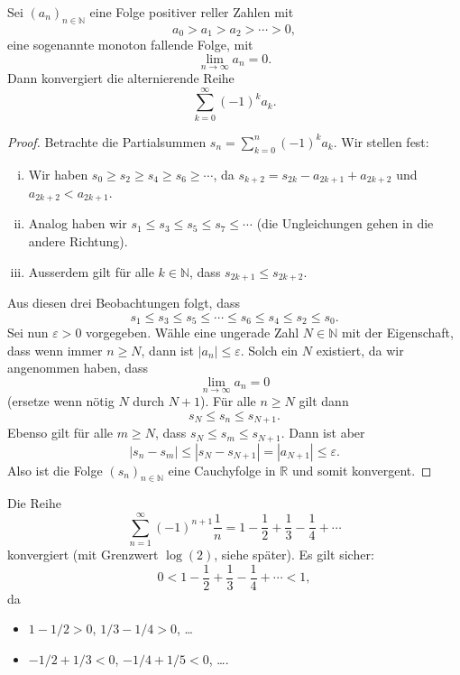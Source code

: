 \documentclass[../main.tex]{subfiles}
\begin{document}
\begin{leibniz}
  Sei ${(a_{n})}_{n \in \mathbb{N}}$ eine Folge
  positiver reller Zahlen mit
  \[
   a_0 > a_1 > a_2 > \cdots > 0,
  \]
  eine sogenannte
  monoton fallende Folge, mit 
  \[
    \lim_{n \to \infty}a_n = 0.
  \]
  Dann konvergiert die alternierende Reihe
  \[
    \sum_{k=0}^{\infty} {(-1)}^k a_k.
  \]
\end{leibniz}

\begin{proof}
  Betrachte die Partialsummen $s_n = \sum_{k=0}^{n} {(-1)}^k a_k$.
  Wir stellen fest:
  \begin{enumerate}[(i)]
    \item Wir haben $s_0 \geq s_2 \geq s_4 \geq s_6 \geq \cdots$,
      da $s_{k+2} = s_{2k} - a_{2k+1} + a_{2k+2}$ und
      $a_{2k+2}<a_{2k+1}$.
    \item Analog haben wir 
      $s_1 \leq s_3 \leq s_5 \leq s_7 \leq \cdots$ (die
      Ungleichungen gehen in die andere Richtung).
    \item Ausserdem gilt für alle $k \in \mathbb{N}$, dass
      $s_{2k+1} \leq s_{2k+2}$.
  \end{enumerate}
  Aus diesen drei Beobachtungen folgt, dass
  \[
    s_1 \leq s_3 \leq s_5 \leq \cdots \leq s_6 \leq s_4 \leq
    s_2 \leq s_0.
  \]
  Sei nun $\varepsilon > 0$ vorgegeben. Wähle 
  eine ungerade Zahl $N \in \mathbb{N}$ 
  mit der Eigenschaft, dass wenn immer $n \geq N$, dann
  ist $|a_n| \leq \varepsilon$. Solch ein $N$ existiert,
  da wir angenommen haben, dass
  \[
    \lim_{n \to \infty} a_n = 0
  \]
  (ersetze wenn nötig $N$ durch $N + 1$).
  Für alle $n \geq N$ gilt dann
  \[
    s_N \leq s_n \leq s_{N+1}.
  \]
  Ebenso gilt für alle $m \geq N$, dass
  $s_N \leq s_m \leq s_{N+1}$. Dann ist aber
  \[
    |s_n - s_m| \leq |s_N - s_{N+1}| = |a_{N+1}| \leq \varepsilon.
  \]
  Also ist die Folge ${(s_{n})}_{n \in \mathbb{N}}$
  eine Cauchyfolge in $\mathbb{R}$ und somit konvergent.
\end{proof}

\begin{example}
  Die Reihe
  \[
    \sum_{n=1}^{\infty} {(-1)}^{n+1} \frac{1}{n}
    = 1 - \frac{1}{2} + \frac{1}{3} - \frac{1}{4} + \cdots
  \]
  konvergiert (mit Grenzwert $\log(2)$, siehe später).
  Es gilt sicher:
  \[
    0 < 1 - \frac{1}{2} + \frac{1}{3} - \frac{1}{4}
    + \cdots < 1,
  \]
  da
  \begin{itemize}
    \item $1 - 1/2 > 0$, $1/3 - 1/4 > 0$, \dots
    \item $-1/2 + 1/3 < 0$, $-1/4 + 1/5 < 0$, \dots.
  \end{itemize}
\end{example}
\end{document}
